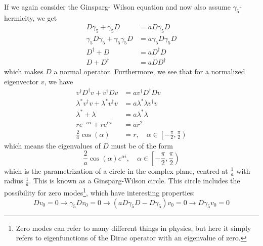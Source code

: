 \documentclass[a4paper,10pt]{book}
\begin{document}
If we again consider the Ginsparg- Wilson equation and now also assume $\gamma_5$-hermicity, we get
\begin{equation*}
\begin{aligned} 
D \gamma_{5}+\gamma_{5} D&=a D \gamma_{5} D\\
\gamma_5D\gamma_5 + \gamma_5\gamma_5D &= a \gamma_5D\gamma_5D\\D^\dagger +D &= aD^\dagger D\\D +D^\dagger &= aD D^\dagger
\end{aligned}
\end{equation*}
which makes $D$ a normal operator. Furthermore, we see that for a normalized eigenvector $v$, we have
\begin{equation}
\begin{aligned} 
v^\dagger D^\dagger v +v^\dagger Dv &= av^\dagger D^\dagger D v\\\lambda^*v^\dagger v +\lambda^*v^\dagger v &= a \lambda^*\lambda v^\dagger v\\ \lambda^* + \lambda &= a\lambda^*\lambda\\re^{-\alpha i} +re^{\alpha i} &= ar^2\\\frac{2}{a}\cos(\alpha) &= r,\quad\alpha \in \left[-\frac{\pi}{2}, \frac{\pi}{2} \right)
\end{aligned}
\end{equation}
which means the eigenvalues of $D$ must be of the form
\begin{equation}\label{eq:Ginsparg_wilson_circle}
\frac{2}{a}\cos(\alpha)e^{\alpha i},\quad\alpha \in \left[-\frac{\pi}{2}, \frac{\pi}{2} \right)
\end{equation}
which is the parametrization of a circle in the complex plane, centred at $\frac{1}{a}$ with radius $\frac{1}{a}$. This is known as a Ginsparg-Wilson circle. This circle includes the possibility for zero modes\footnote{Zero modes can refer to many different things in physics, but here it simply refers to eigenfunctions of the Dirac operator with an eigenvalue of zero.}, which have interesting properties:
\begin{equation}
Dv_0 = 0 \rightarrow \gamma_5Dv_0 = 0 \rightarrow \left( aD\gamma_5D - D\gamma_5 \right)v_0 = 0 \rightarrow D\gamma_5v_0 = 0
\end{equation}
\end{document}
